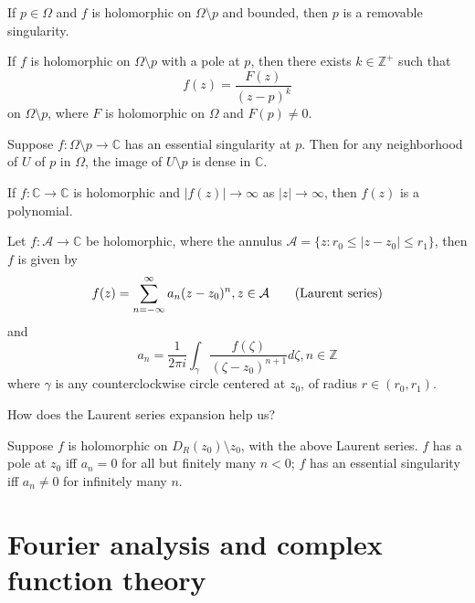 \documentclass[openany]{book}
\newcommand{\C}{\mathbb{C}}
\begin{document}
\begin{prop}
    If $p\in\Omega$ and $f$ is holomorphic on $\Omega\setminus p$ and bounded, then $p$ is a removable singularity.
\end{prop}

\begin{prop}
    If $f$ is holomorphic on $\Omega\setminus p$ with a pole at $p$, then there exists $k\in\mathbb{Z}^+$ such that 
    \begin{equation*}
        f(z)=\frac{F(z)}{(z-p)^k}
    \end{equation*}
    on $\Omega\setminus p$, where $F$ is holomorphic on $\Omega$ and $F(p)\neq 0$.
\end{prop}


\begin{prop}
    Suppose $f:\Omega\setminus p\to\C$ has an essential singularity at $p$. Then for any neighborhood of $U$ of $p$ in $\Omega$, the image of $U\setminus p$ is dense in $\C$.
\end{prop}


\begin{prop}
    If $f:\C\to\C$ is holomorphic and $|f(z)|\to\infty$ as $|z|\to\infty$, then $f(z)$ is a polynomial.
\end{prop}

\begin{prop}
    Let $f:\mathcal{A}\to\C$ be holomorphic, where the annulus $\mathcal{A}=\{z: r_0\leq |z-z_0|\leq r_1\}$, then $f$ is given by 
    \begin{equation*}
        f(z)=\sum_{n=-\infty}^\infty a_n(z-z_0)^n, z\in\mathcal{A} \tag{\text{Laurent series}}
    \end{equation*}
    and 
    \begin{equation*}
        a_n=\frac{1}{2\pi i}\int_\gamma \frac{f(\zeta)}{(\zeta-z_0)^{n+1}}d\zeta, n\in\mathbb{Z}
    \end{equation*}
    where $\gamma$ is any counterclockwise circle centered at $z_0$, of radius $r\in(r_0,r_1)$. 
\end{prop}
How does the Laurent series expansion help us?
\begin{prop}
    Suppose $f$ is holomorphic on $D_R(z_0)\setminus z_0$, with the above Laurent series. $f$ has a pole at $z_0$ iff $a_n=0$ for all but finitely many $n<0$; $f$ has an essential singularity iff $a_n\neq 0$ for infinitely many $n$.
\end{prop}



\chapter{Fourier analysis and complex function theory}
\end{document}
